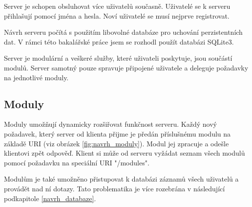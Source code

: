 Server je schopen obsluhovat více uživatelů současně.
Uživatelé se k serveru přihlašují pomocí jména a hesla. Noví uživatelé se musí nejprve registrovat.

Návrh serveru počítá s použitím libovolné databáze pro uchování perzistentních dat. V rámci této bakalářské práce jsem se 
rozhodl použít databázi SQLite3.

Server je modulární a veškeré služby, které uživateli poskytuje, jsou součástí modulů. Server samotný pouze spravuje
připojené uživatele a deleguje požadavky na jednotlivé moduly.

\subsection{Moduly}
\label{navrh_moduly}

Moduly umožňují dynamicky rozšiřovat funkčnost serveru. Každý nový požadavek, který server od klienta přijme je
předán příslušnému modulu na základě URI (viz obrázek \ref{fig:navrh_moduly}).
Modul jej zpracuje a odešle klientovi zpět odpověď. Klient si může
od serveru vyžádat seznam všech modulů pomocí požadavku na speciální URI "/modules".

Modulům je také umožněno přistupovat k databázi záznamů všech uživatelů a provádět nad ní dotazy. Tato problematika je více
rozebrána v následující podkapitole \ref{navrh_databaze}.

